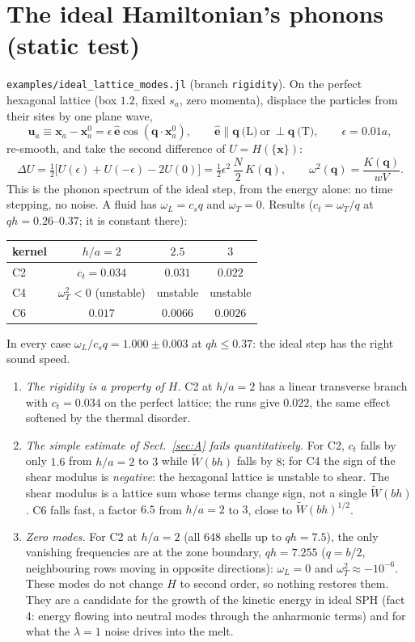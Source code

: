 \documentclass[11pt,aps,preprint,nofootinbib,superscriptaddress,tightenlines]{revtex4-2}
\def\st{\begin{equation}}
\def\stp{\end{equation}}
\def\Sect#1{Sect.~\ref{#1}}
\begin{document}
\section{The ideal Hamiltonian's phonons (static test)}
\label{sec:phonons}

\texttt{examples/ideal\_lattice\_modes.jl} (branch \texttt{rigidity}).  On the perfect hexagonal
lattice (box $1.2$, fixed $s_a$, zero momenta), displace the particles from their sites by one
plane wave,
\st
\bm u_a\equiv\bm x_a-\bm x_a^0=\epsilon\,\hat{\bm e}\cos(\bm q\cdot\bm x_a^0),\qquad
\hat{\bm e}\parallel\bm q\ \text{(L)}\ \text{or}\ \perp\bm q\ \text{(T)},\qquad \epsilon=0.01a,
\stp
re-smooth, and take the second difference of $U=H(\{\bm x\})$:
\st
\Delta U=\tfrac12\big[U(\epsilon)+U(-\epsilon)-2U(0)\big]=\tfrac12\epsilon^2\,\frac N2\,K(\bm q),
\qquad \omega^2(\bm q)=\frac{K(\bm q)}{wV} .
\stp
This is the phonon spectrum of the ideal step, from the energy alone: no time stepping, no
noise.  A fluid has $\omega_L=c_sq$ and $\omega_T=0$.  Results ($c_t=\omega_T/q$ at
$qh=0.26$--$0.37$; it is constant there):
\begin{center}
\begin{tabular}{lccc}
\hline
kernel & $h/a=2$ & $2.5$ & $3$ \\ \hline
C2 & $c_t=0.034$ & $0.031$ & $0.022$ \\
C4 & $\omega_T^2<0$ (unstable) & unstable & unstable \\
C6 & $0.017$ & $0.0066$ & $0.0026$ \\
\hline
\end{tabular}
\end{center}
In every case $\omega_L/c_sq=1.000\pm0.003$ at $qh\le0.37$: the ideal step has the right sound
speed.
\begin{enumerate}
\item \emph{The rigidity is a property of $H$.}  C2 at $h/a=2$ has a linear transverse branch
  with $c_t=0.034$ on the perfect lattice; the runs give $0.022$, the same effect softened by
  the thermal disorder.
\item \emph{The simple estimate of \Sect{sec:A} fails quantitatively.}  For C2, $c_t$ falls by
  only $1.6$ from $h/a=2$ to $3$ while $\tilde W(bh)$ falls by $8$; for C4 the sign of the
  shear modulus is \emph{negative}: the hexagonal lattice is unstable to shear.  The shear
  modulus is a lattice sum whose terms change sign, not a single $\tilde W(bh)$.  C6 falls fast,
  a factor $6.5$ from $h/a=2$ to $3$, close to $\tilde W(bh)^{1/2}$.
\item \emph{Zero modes.}  For C2 at $h/a=2$ (all 648 shells up to $qh=7.5$), the only
  vanishing frequencies are at the zone boundary, $qh=7.255$ ($q=b/2$, neighbouring rows moving
  in opposite directions): $\omega_L=0$ and $\omega_T^2\approx-10^{-6}$.  These modes do not
  change $H$ to second order, so nothing restores them.  They are a candidate for the growth of
  the kinetic energy in ideal SPH (fact 4: energy flowing into neutral modes through the
  anharmonic terms) and for what the $\lambda=1$ noise drives into the melt.
\end{enumerate}
\end{document}
